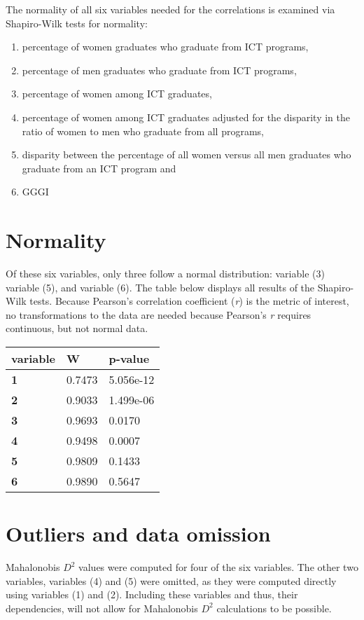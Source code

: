 \documentclass[]{book}
\providecommand{\tightlist}{%
  \setlength{\itemsep}{0pt}\setlength{\parskip}{0pt}}
\begin{document}
The normality of all six variables needed for the correlations is
examined via Shapiro-Wilk tests for normality:

\begin{enumerate}
\def\labelenumi{\arabic{enumi}.}
\tightlist
\item
  percentage of women graduates who graduate from ICT programs,
\item
  percentage of men graduates who graduate from ICT programs,
\item
  percentage of women among ICT graduates,
\item
  percentage of women among ICT graduates adjusted for the disparity in
  the ratio of women to men who graduate from all programs,
\item
  disparity between the percentage of all women versus all men graduates
  who graduate from an ICT program and
\item
  GGGI
\end{enumerate}

\section{Normality}\label{normality}

Of these six variables, only three follow a normal distribution:
variable (3) variable (5), and variable (6). The table below displays
all results of the Shapiro-Wilk tests. Because Pearson's correlation
coefficient (\emph{r}) is the metric of interest, no transformations to
the data are needed because Pearson's \emph{r} requires continuous, but
not normal data.

\begin{longtable}[]{@{}lll@{}}
\toprule
variable & W & p-value\tabularnewline
\midrule
\endhead
\textbf{1} & 0.7473 & 5.056e-12\tabularnewline
\textbf{2} & 0.9033 & 1.499e-06\tabularnewline
\textbf{3} & 0.9693 & 0.0170\tabularnewline
\textbf{4} & 0.9498 & 0.0007\tabularnewline
\textbf{5} & 0.9809 & 0.1433\tabularnewline
\textbf{6} & 0.9890 & 0.5647\tabularnewline
\bottomrule
\end{longtable}

\section{Outliers and data omission}\label{outliers-and-data-omission}

Mahalonobis \(D^{2}\) values were computed for four of the six
variables. The other two variables, variables (4) and (5) were omitted,
as they were computed directly using variables (1) and (2). Including
these variables and thus, their dependencies, will not allow for
Mahalonobis \(D^{2}\) calculations to be possible.
\end{document}
